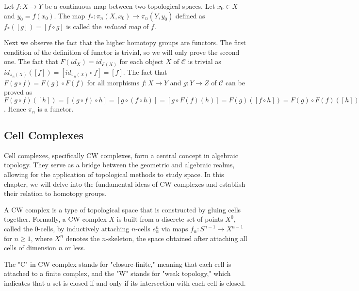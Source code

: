 \documentclass[12pt]{article}
\begin{document}
\begin{definition}
	Let \(f : X \rightarrow Y\) be a continuous map between two topological spaces. Let \(x_0 \in X\) and \(y_0 = f(x_0)\). The map \(f_* : \pi_n(X, x_0) \rightarrow \pi_n(Y, y_0)\) defined as \(f_*([g]) = [f \circ g]\) is called the \textit{induced map} of \(f\).
\end{definition}

Next we observe the fact that the higher homotopy groups are functors. The first condition of the definition of functor is trivial, so we will only prove the second one. The fact that \(F(id_X) = id_{F(X)}\) for each object \(X\) of \(\mathcal{C}\) is trivial as \(id_{\pi_n(X)}([f]) = [id_{\pi_n(X)} \circ f] = [f]\). The fact that \(F(g \circ f) = F(g) \circ F(f)\) for all morphisms \(f : X \rightarrow Y\) and \(g : Y \rightarrow Z\) of \(\mathcal{C}\) can be proved as \(F(g \circ f)([h]) = [(g \circ f) \circ h] = [g \circ (f \circ h)] = [g \circ F(f)(h)] = F(g)([f \circ h]) = F(g) \circ F(f)([h])\). Hence \(\pi_n\) is a functor.

\subsection{Cell Complexes}

Cell complexes, specifically CW complexes, form a central concept in algebraic topology. They serve as a bridge between the geometric and algebraic realms, allowing for the application of topological methods to study space. In this chapter, we will delve into the fundamental ideas of CW complexes and establish their relation to homotopy groups.

\begin{definition}[CW Complex]
	A CW complex is a type of topological space that is constructed by gluing cells together. Formally, a CW complex \(X\) is built from a discrete set of points \(X^0\), called the 0-cells, by inductively attaching \(n\)-cells \(e^n_\alpha\) via maps \(f_\alpha: S^{n-1} \rightarrow X^{n-1}\) for \(n \geq 1\), where \(X^n\) denotes the \(n\)-skeleton, the space obtained after attaching all cells of dimension \(n\) or less.
\end{definition}

The "C" in CW complex stands for "closure-finite," meaning that each cell is attached to a finite complex, and the "W" stands for "weak topology," which indicates that a set is closed if and only if its intersection with each cell is closed. 
\end{document}
